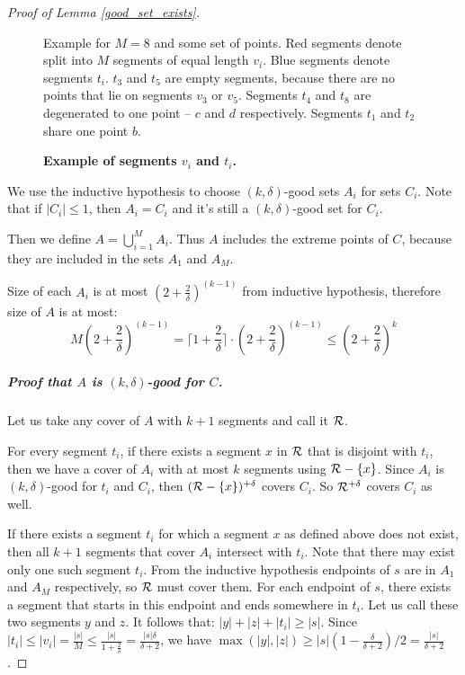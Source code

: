 \begin{proof}[Proof of Lemma \ref{good_set_exists}]
\begin{figure}[h]
\centering
\def\svgwidth{0.5\columnwidth}

\caption{\textbf{Example of segments $v_i$ and $t_i$.}}
Example for $M = 8$ and some set of points.
Red segments denote split into $M$ segments of equal length $v_i$.
Blue segments denote segments $t_i$. $t_3$ and $t_5$ are empty segments,
because there are no points that lie on segments $v_3$ or $v_5$.
Segments $t_4$ and $t_8$ are degenerated to one point --
$c$ and $d$ respectively.
Segments $t_1$ and $t_2$ share one point $b$.
\label{fig:fpt_v_f_def}
\end{figure}

We use the inductive hypothesis to choose $(k, \delta)$-good sets $A_i$
for sets $C_i$. Note that if $|C_i| \le 1$, then $A_i = C_i$
and it's still a $(k, \delta)$-good set for $C_i$.

Then we define $A = \bigcup_{i=1}^{M} A_i$.
Thus $A$ includes the extreme points of $C$,
because they are included in the sets $A_1$ and $A_M$.

Size of each $A_i$ is at most $(2+\frac{2}{\delta})^(k-1)$ from inductive
hypothesis, therefore size of $A$ is at most:
$$M(2+\frac{2}{\delta})^{(k-1)} =
\lceil1+\frac{2}{\delta}\rceil\cdot(2+\frac{2}{\delta})^{(k-1)}
\le (2+\frac{2}{\delta})^k$$


\subparagraph{Proof that $A$ is $(k, \delta)$-good for $C$.}
Let us take any cover of $A$ with $k+1$ segments and call it $\mathcal{R}$.

For every segment $t_i$, if there exists a segment $x$ in $\mathcal{R}$ 
that is disjoint with $t_i$,
then we have a cover of $A_i$ with at most $k$
segments using $\mathcal{R} - \{x\}$.
Since $A_i$ is $(k, \delta)$-good for $t_i$ and $C_i$,
then $(\mathcal{R} - \{x\})^{+\delta}$ covers $C_i$.
So $\mathcal{R}^{+\delta}$ covers $C_i$ as well.

If there exists a segment $t_i$ for which a segment $x$ as defined above
does not exist, then all $k+1$ segments that cover
$A_i$ intersect with $t_i$.
Note that there may exist only one such segment $t_i$.
From the inductive hypothesis endpoints of $s$ are
in $A_1$ and $A_M$ respectively, so $\mathcal{R}$ must cover them.
For each endpoint of $s$, there exists
a segment that starts in this endpoint and ends somewhere in $t_i$.
Let us call these two segments $y$ and $z$. It follows that:
$|y| + |z| + |t_i| \ge |s|$.
Since $|t_i| \le |v_i| = \frac{|s|}{M} \le \frac{|s|}{1+\frac{2}{\delta}} = \frac{|s|\delta}{\delta+2}$,
we have $\max(|y|, |z|) \ge |s|(1-\frac{\delta}{\delta+2})/2 = \frac{|s|}{\delta+2}$.


\end{proof}
